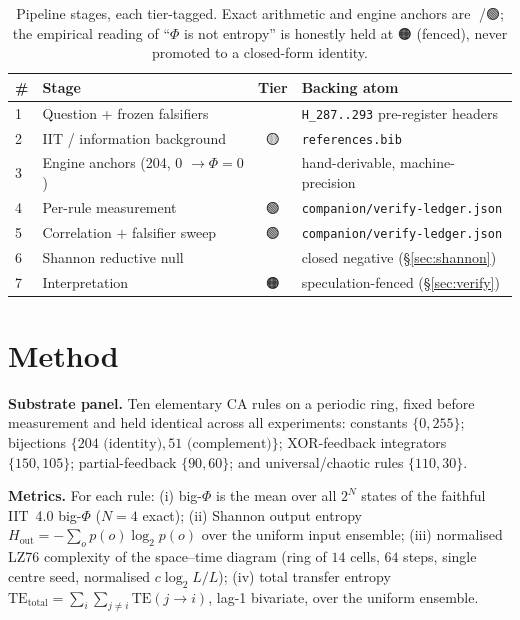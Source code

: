 \documentclass[11pt,a4paper]{article}
\providecommand{\tierBlue}{🔵}
\providecommand{\tierGreen}{🟢}
\providecommand{\tierYellow}{🟡}
\providecommand{\tierOrange}{🟠}
\providecommand{\tierRed}{🔴}
\newcommand{\bigphi}{\ensuremath{\Phi}}
\begin{document}
\medskip
\begin{table}[h]
\centering
\small
\begin{tabular}{@{}>{\centering\arraybackslash}m{0.4cm} >{\raggedright\arraybackslash}m{4.6cm} c >{\raggedright\arraybackslash}m{5.6cm}@{}}
\toprule
\textbf{\#} & \textbf{Stage} & \textbf{Tier} & \textbf{Backing atom} \\
\midrule
\textcircled{\scriptsize 1} & Question + frozen falsifiers  & \tierBlue   & \texttt{H\_287..293} pre-register headers \\
\textcircled{\scriptsize 2} & IIT / information background  & \tierYellow & \texttt{references.bib} \\
\textcircled{\scriptsize 3} & Engine anchors (204, 0 \(\to\bigphi{=}0\)) & \tierBlue   & hand-derivable, machine-precision \\
\textcircled{\scriptsize 4} & Per-rule measurement          & \tierGreen  & \texttt{companion/verify-ledger.json} \\
\textcircled{\scriptsize 5} & Correlation \(+\) falsifier sweep & \tierGreen  & \texttt{companion/verify-ledger.json} \\
\textcircled{\scriptsize 6} & Shannon reductive null        & \tierRed    & closed negative (\S\ref{sec:shannon}) \\
\textcircled{\scriptsize 7} & Interpretation                & \tierOrange & speculation-fenced (\S\ref{sec:verify}) \\
\bottomrule
\end{tabular}
\caption{Pipeline stages, each tier-tagged. Exact arithmetic and engine
anchors are \tierBlue/\tierGreen; the empirical reading of ``\bigphi{} is
not entropy'' is honestly held at \tierOrange{} (fenced), never promoted to
a closed-form identity.}
\label{tab:pipeline}
\end{table}

\section{Method}
\label{sec:method}

\textbf{Substrate panel.} Ten elementary CA rules on a periodic ring,
fixed before measurement and held identical across all experiments:
constants \(\{0,255\}\); bijections \(\{204\text{ (identity)},
51\text{ (complement)}\}\); XOR-feedback integrators \(\{150,105\}\);
partial-feedback \(\{90,60\}\); and universal/chaotic rules \(\{110,30\}\).

\textbf{Metrics.} For each rule: (i) big-\bigphi{} is the mean over all
\(2^N\) states of the faithful IIT~4.0 big-\bigphi{} (\(N=4\) exact);
(ii) Shannon output entropy \(H_\mathrm{out}=-\sum_o p(o)\log_2 p(o)\)
over the uniform input ensemble; (iii) normalised LZ76 complexity of the
space--time diagram (ring of \(14\) cells, \(64\) steps, single centre
seed, normalised \(c\log_2 L/L\)); (iv) total transfer entropy
\(\mathrm{TE}_\mathrm{total}=\sum_{i}\sum_{j\neq i}\mathrm{TE}(j\!\to\!i)\),
lag-1 bivariate, over the uniform ensemble.
\end{document}
